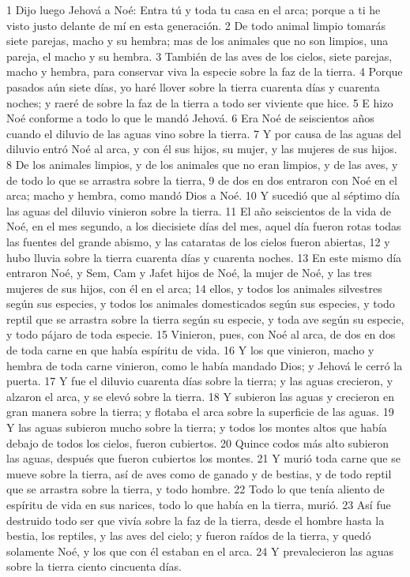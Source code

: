 1 Dijo luego Jehová a Noé: Entra tú y toda tu casa en el arca; porque a ti he visto justo delante de mí en esta generación.
2 De todo animal limpio tomarás siete parejas, macho y su hembra; mas de los animales que no son limpios, una pareja, el macho y su hembra.
3 También de las aves de los cielos, siete parejas, macho y hembra, para conservar viva la especie sobre la faz de la tierra.
4 Porque pasados aún siete días, yo haré llover sobre la tierra cuarenta días y cuarenta noches; y raeré de sobre la faz de la tierra a todo ser viviente que hice.
5 E hizo Noé conforme a todo lo que le mandó Jehová.
6 Era Noé de seiscientos años cuando el diluvio de las aguas vino sobre la tierra.
7 Y por causa de las aguas del diluvio entró Noé al arca, y con él sus hijos, su mujer, y las mujeres de sus hijos.
8 De los animales limpios, y de los animales que no eran limpios, y de las aves, y de todo lo que se arrastra sobre la tierra,
9 de dos en dos entraron con Noé en el arca; macho y hembra, como mandó Dios a Noé.
10 Y sucedió que al séptimo día las aguas del diluvio vinieron sobre la tierra.
11 El año seiscientos de la vida de Noé, en el mes segundo, a los diecisiete días del mes, aquel día fueron rotas todas las fuentes del grande abismo, y las cataratas de los cielos fueron abiertas,
12 y hubo lluvia sobre la tierra cuarenta días y cuarenta noches.
13 En este mismo día entraron Noé, y Sem, Cam y Jafet hijos de Noé, la mujer de Noé, y las tres mujeres de sus hijos, con él en el arca;
14 ellos, y todos los animales silvestres según sus especies, y todos los animales domesticados según sus especies, y todo reptil que se arrastra sobre la tierra según su especie, y toda ave según su especie, y todo pájaro de toda especie.
15 Vinieron, pues, con Noé al arca, de dos en dos de toda carne en que había espíritu de vida.
16 Y los que vinieron, macho y hembra de toda carne vinieron, como le había mandado Dios; y Jehová le cerró la puerta.
17 Y fue el diluvio cuarenta días sobre la tierra; y las aguas crecieron, y alzaron el arca, y se elevó sobre la tierra.
18 Y subieron las aguas y crecieron en gran manera sobre la tierra; y flotaba el arca sobre la superficie de las aguas.
19 Y las aguas subieron mucho sobre la tierra; y todos los montes altos que había debajo de todos los cielos, fueron cubiertos.
20 Quince codos más alto subieron las aguas, después que fueron cubiertos los montes.
21 Y murió toda carne que se mueve sobre la tierra, así de aves como de ganado y de bestias, y de todo reptil que se arrastra sobre la tierra, y todo hombre.
22 Todo lo que tenía aliento de espíritu de vida en sus narices, todo lo que había en la tierra, murió.
23 Así fue destruido todo ser que vivía sobre la faz de la tierra, desde el hombre hasta la bestia, los reptiles, y las aves del cielo; y fueron raídos de la tierra, y quedó solamente Noé, y los que con él estaban en el arca.
24 Y prevalecieron las aguas sobre la tierra ciento cincuenta días.

